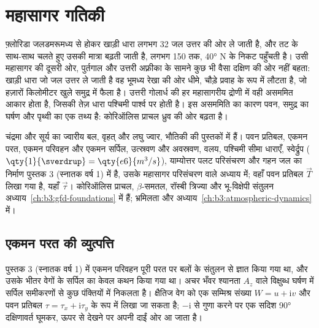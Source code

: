 \chapter{महासागर गतिकी}\label{ch:b3:ocean-dynamics}

फ़्लोरिडा जलडमरूमध्य से होकर खाड़ी धारा लगभग
\qty{32}{\sverdrup} जल उत्तर की ओर ले जाती है, और तट के साथ-साथ चलते हुए उसकी मात्रा बढ़ती जाती है,
लगभग \qty{150}{\sverdrup} तक, \ang{40} N के निकट पहुँचती है। उसी महासागर की दूसरी ओर, पुर्तगाल और उत्तरी अफ़्रीका के
सामने कुछ भी वैसा दक्षिण की ओर नहीं बहता: खाड़ी धारा जो जल उत्तर ले जाती है
वह भूमध्य रेखा की ओर धीमे, चौड़े प्रवाह के रूप में लौटता है, जो हज़ारों
किलोमीटर खुले समुद्र में फैला है। उत्तरी गोलार्ध की हर महासागरीय द्रोणी में
वही असममित आकार होता है, जिसकी तेज़ धारा पश्चिमी पार्श्व पर होती है।
इस असममिति का कारण पवन, समुद्र का घर्षण और पृथ्वी का एक तथ्य है:
कोरिऑलिस प्राचल ध्रुव की ओर बढ़ता है।

\begin{recall}
चंद्रमा और सूर्य का ज्वारीय बल, वृहत् और लघु ज्वार, भौतिकी की
पुस्तकों में हैं। पवन प्रतिबल, एकमन परत, एकमन परिवहन और
एकमन सर्पिल, उत्स्रवण और अवस्रवण, वलय, पश्चिमी
सीमा धाराएँ, स्वेर्द्रुप ($\qty{1}{\sverdrup} =
\qty{e6}{m^3/s}$), याम्योत्तर पलट परिसंचरण और
गहन जल का निर्माण पुस्तक 3 (स्नातक वर्ष 1) में है, उसके महासागर
परिसंचरण वाले अध्याय में; वहाँ पवन प्रतिबल $\vec T$ लिखा गया है, यहाँ
$\vec\tau$। कोरिऑलिस प्राचल, $\beta$-समतल, रॉस्बी त्रिज्या
और भू-विक्षेपी संतुलन अध्याय~\ref{ch:b3:gfd-foundations} में हैं;
भ्रमिलता और  अध्याय~\ref{ch:b3:atmospheric-dynamics} में।
\end{recall}

\section{एकमन परत की व्युत्पत्ति}\label{sec:b3:ocean-dynamics:ekman}

पुस्तक 3 (स्नातक वर्ष 1) में एकमन परिवहन पूरी परत पर बलों के संतुलन से ज्ञात किया गया था,
और उसके भीतर वेगों के सर्पिल का केवल कथन किया गया था। अचर भँवर श्यानता
$A_z$ वाले विक्षुब्ध घर्षण में सर्पिल
समीकरणों से कुछ पंक्तियों में निकलता है। क्षैतिज वेग को एक
सम्मिश्र संख्या $W = u + \mathrm iv$ और पवन प्रतिबल $\tau =
\tau_x + \mathrm i\tau_y$ के रूप में लिखा जा सकता है; $-\mathrm i$ से गुणा करने पर एक सदिश
\ang{90} दक्षिणावर्त घूमकर, ऊपर से देखने पर अपनी दाईं ओर आ जाता है।

